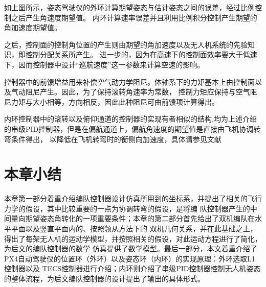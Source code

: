 如上图所示，姿态驾驶仪的外环计算期望姿态与估计姿态之间的误差，经过比例控制之后产生角速度期望值。
内环计算速率误差并且利用比例积分控制产生期望的角加速度期望值。

之后，控制面的控制角位置的产生则由期望的角加速度以及无人机系统的先验知识，即控制分配关系所产生。
进一步的，因为在高速下的控制面效率要大于低速下，因而控制器中设计“巡航速度”这一参数来计算空速的影响。

控制器中的前馈增益用来补偿空气动力学阻尼。体轴系下的力矩基本上由控制面以及气动阻尼产生。因此，为了保持滚转角速率为常数，
控制力矩应保持与空气阻尼力矩与大小相等，方向相反，因此此种阻尼可由前馈项计算得出。

内环控制器中的滚转以及俯仰通道的控制器的实现有者相似的结构,均为上述介绍的串级PID控制器，但是在偏航通道上，偏航角速度的期望值是直接由飞机协调转弯条件得出，
以降低在飞机转弯时的衡侧向加速度，具体请参见文献\cite{Fangzhenping2005}
\section{本章小结}
本章第一部分着重介绍编队控制器设计仿真所用到的坐标系，并提出了相关的飞行力学的假设，其中比较重要的一点为协调转弯的假设，是将编
队控制器产生的中间量向期望姿态角转化的一项重要条件；本章的第二部分首先给出了双机编队在水平平面以及竖直平面内的、按照领从方法下的
双机几何关系，并在此基础之上，得出了每架无人机的运动学模型，并按照相关的假设，对此运动方程进行了简化，为后文的编队控制器的数学
仿真提供了数学模型。最后一部分，本文着重介绍了PX4自动驾驶仪的位置环（外环）以及姿态环（内环）的实现原理：外环选取L1控制器以及
TECS控制器进行介绍；内环则介绍了串级PID控制器控制无人机姿态的整体流程，为后文编队控制器的设计提出了输出的具体形式。
